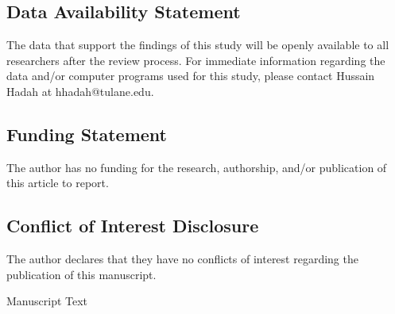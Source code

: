 \documentclass[12pt,english]{article}
\begin{document}
\subsection*{Data Availability Statement}
The data that support the findings of this study will be openly available to all researchers after the review process. For immediate information regarding the data and/or computer programs used for this study, please contact Hussain Hadah at hhadah@tulane.edu.

\subsection*{Funding Statement}

The author has no funding for the research, authorship, and/or publication of this article to report.

\subsection*{Conflict of Interest Disclosure}
The author declares that they have no conflicts of interest regarding the publication of this manuscript.

\clearpage 


\setcounter{page}{1}
\renewcommand*{\thefootnote}{\arabic{footnote}}
\doublespacing
\begingroup
  \centering
  \Large Manuscript Text\\[1em]
\endgroup


\newpage
\begingroup
{}
\setlength\bibitemsep{5.0pt}
\printbibliography[title=References for Manuscript]
\endgroup
\pagebreak






% 



\clearpage
\end{document}
